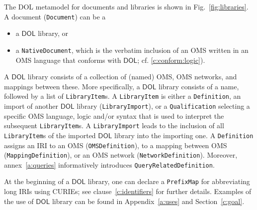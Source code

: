 \documentclass[10pt, a4paper]{isov2}
\makeatletter
\newcommand*{\cf}{cf.\@\xspace}
\newcommand*{\termref}[1]{\index{#1}#1\xspace}
\newcommand*{\syntax}[1]{\texttt{#1}}
\newcommand*{\DOL}{\ensuremath{\mathsf{DOL}}\xspace}
\renewcommand{\clauserefname}{clause}
\renewcommand{\cref}[1]{\clauserefname~\ref{#1}}
\makeatother
\begin{document}

\label{c:libraries}



The DOL metamodel for documents and libraries is shown in Fig.~\ref{fig:libraries}.
A \termref{document} (\syntax{Document}) can be a 
\begin{itemize}
\item a \DOL library, or
\item a \syntax{NativeDocument}, which is the verbatim inclusion of an
  OMS written in an OMS language that conforms with \DOL; \cf
  \ref{c:conform:logic}).
\end{itemize}
A \DOL library consists of a collection of (named)  OMS,  OMS networks, and mappings between these.  More specifically, a \DOL
library consists of a name, followed by a list of
\syntax{LibraryItem}s.  A \syntax{LibraryItem} is either a
\syntax{Definition},
an import of another \DOL library (\syntax{LibraryImport}),
or a \syntax{Qualification} selecting a specific
OMS language, logic and/or syntax that is used to interpret the
subsequent \syntax{LibraryItem}s.  
 A \syntax{LibraryImport} leads to the inclusion of all \syntax{LibraryItem}s of the imported \DOL library into the importing one.
A \syntax{Definition} assigns an IRI to an OMS  (\syntax{OMSDefinition}), 
to a mapping between OMS (\syntax{MappingDefinition}), or
an OMS network  (\syntax{NetworkDefinition}). Moreover, annex~\ref{a:queries}
informatively introduces \syntax{QueryRelatedDefinition}.

At the beginning of a \DOL library, one can declare a \syntax{PrefixMap} for abbreviating long IRIs  using CURIEs; see \cref{c:identifiers} for further details. Examples of the use of \DOL library can be found in Appendix~\ref{a:uses} and Section~\ref{c:goal}.
\end{document}
